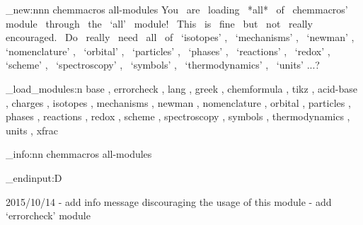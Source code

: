 %
%
%
%
%

\msg_new:nnn {chemmacros} {all-modules}
  {
    You~ are~ loading~ *all*~ of~ chemmacros'~ module~ through~ the~ `all'~
    module!~ This~ is~ fine~ but~ not~ really~ encouraged.~ Do~ really~ need~
    all~ of~ `isotopes' ,~ `mechanisms' ,~ `newman' ,~ `nomenclature' ,~
    `orbital' ,~ `particles' ,~ `phases' ,~ `reactions' ,~ `redox' ,~ `scheme'
    ,~ `spectroscopy' ,~ `symbols' ,~ `thermodynamics' ,~ `units' ...?
  }

\chemmacros_load_modules:n
  {
     base ,
     errorcheck ,
     lang ,
     greek ,
     chemformula ,
     tikz ,
     acid-base ,
     charges ,
     isotopes ,
     mechanisms ,
     newman ,
     nomenclature ,
     orbital ,
     particles ,
     phases ,
     reactions ,
     redox ,
     scheme ,
     spectroscopy ,
     symbols ,
     thermodynamics ,
     units ,
     xfrac
  }

\msg_info:nn {chemmacros} {all-modules}

\tex_endinput:D

2015/10/14 - add info message discouraging the usage of this module
           - add `errorcheck' module
